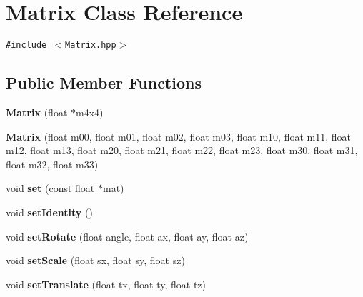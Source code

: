 \hypertarget{classm3g_1_1Matrix}{
\section{Matrix Class Reference}
\label{classm3g_1_1Matrix}
}
{\tt \#include $<$Matrix.hpp$>$}

\subsection*{Public Member Functions}
\begin{CompactItemize}
\item 
\hypertarget{classm3g_1_1Matrix_04fd433badb74a2d60395217701d4009}{
\textbf{Matrix} (float $\ast$m4x4)}
\label{classm3g_1_1Matrix_04fd433badb74a2d60395217701d4009}

\item 
\hypertarget{classm3g_1_1Matrix_2c2f600f3a4c1db4a0da0b57db8aebca}{
\textbf{Matrix} (float m00, float m01, float m02, float m03, float m10, float m11, float m12, float m13, float m20, float m21, float m22, float m23, float m30, float m31, float m32, float m33)}
\label{classm3g_1_1Matrix_2c2f600f3a4c1db4a0da0b57db8aebca}

\item 
\hypertarget{classm3g_1_1Matrix_ed427d2cd38fe4a0b23f7f80803b7fd5}{
void \textbf{set} (const float $\ast$mat)}
\label{classm3g_1_1Matrix_ed427d2cd38fe4a0b23f7f80803b7fd5}

\item 
\hypertarget{classm3g_1_1Matrix_382e6ad7e6721b121e510959e1011be3}{
void \textbf{setIdentity} ()}
\label{classm3g_1_1Matrix_382e6ad7e6721b121e510959e1011be3}

\item 
\hypertarget{classm3g_1_1Matrix_c4e04770db1fedff14c37b5e4e4a68c6}{
void \textbf{setRotate} (float angle, float ax, float ay, float az)}
\label{classm3g_1_1Matrix_c4e04770db1fedff14c37b5e4e4a68c6}

\item 
\hypertarget{classm3g_1_1Matrix_937d04042c25021532ea2532fe5e3a32}{
void \textbf{setScale} (float sx, float sy, float sz)}
\label{classm3g_1_1Matrix_937d04042c25021532ea2532fe5e3a32}

\item 
\hypertarget{classm3g_1_1Matrix_550cf39dca5ec8d74d719b0dcdecdd4b}{
void \textbf{setTranslate} (float tx, float ty, float tz)}
\label{classm3g_1_1Matrix_550cf39dca5ec8d74d719b0dcdecdd4b}


\end{CompactItemize}
